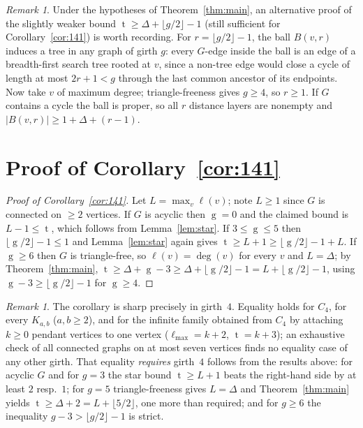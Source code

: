 \documentclass[11pt]{article}
\numberwithin{equation}{section}
\theoremstyle{remark}
\newtheorem{remark}[theorem]{Remark}
\newcommand{\tr}{\operatorname{t}}
\newcommand{\gr}{\operatorname{g}}
\newcommand{\lv}{\ell}
\begin{document}
\begin{remark}
Under the hypotheses of Theorem~\ref{thm:main}, an alternative proof of the
slightly weaker bound $\tr\ge\Delta+\lfloor g/2\rfloor-1$ (still sufficient
for Corollary~\ref{cor:141}) is worth recording.  For
$r=\lfloor g/2\rfloor-1$, the ball $B(v,r)$ induces a tree in any graph of
girth $g$: every $G$-edge inside the ball is an edge of a breadth-first
search tree rooted at $v$, since a non-tree edge would close a cycle of
length at most $2r+1<g$ through the last common ancestor of its endpoints.
Now take $v$ of maximum degree; triangle-freeness gives $g\ge4$, so
$r\ge1$.  If $G$ contains a cycle the ball is proper, so all $r$ distance
layers are nonempty and $|B(v,r)|\ge1+\Delta+(r-1)$.
\end{remark}

\section{Proof of Corollary~\texorpdfstring{\ref{cor:141}}{1.2}}

\begin{proof}[Proof of Corollary~\ref{cor:141}]
Let $L=\max_v\lv(v)$; note $L\ge1$ since $G$ is connected on $\ge2$
vertices.  If $G$ is acyclic then $\gr=0$ and the claimed bound is
$L-1\le\tr$, which follows from Lemma~\ref{lem:star}.  If
$3\le\gr\le5$ then $\lfloor \gr/2\rfloor-1\le1$ and Lemma~\ref{lem:star}
again gives $\tr\ge L+1\ge\lfloor \gr/2\rfloor-1+L$.  If $\gr\ge6$ then $G$
is triangle-free, so $\lv(v)=\deg(v)$ for every $v$ and $L=\Delta$; by
Theorem~\ref{thm:main},
$\tr\ge\Delta+\gr-3\ge\Delta+\lfloor \gr/2\rfloor-1=L+\lfloor
\gr/2\rfloor-1$, using $\gr-3\ge\lfloor \gr/2\rfloor-1$ for $\gr\ge4$.
\end{proof}

\begin{remark}
The corollary is sharp precisely in girth~$4$.  Equality holds for $C_4$, for
every $K_{a,b}$ ($a,b\ge2$), and for the infinite family obtained from $C_4$
by attaching $k\ge0$ pendant vertices to one vertex ($\lv_{\max}=k+2$,
$\tr=k+3$); an exhaustive check of all connected graphs on at most seven
vertices finds no equality case of any other girth.  That equality
\emph{requires} girth~$4$ follows from the results above: for acyclic $G$
and for $g=3$ the star bound $\tr\ge L+1$ beats the right-hand side by at
least $2$ resp.\ $1$; for $g=5$ triangle-freeness gives $L=\Delta$ and
Theorem~\ref{thm:main} yields $\tr\ge\Delta+2=L+\lfloor5/2\rfloor$, one more
than required; and for $g\ge6$ the inequality $g-3>\lfloor g/2\rfloor-1$ is
strict.
\end{remark}
\end{document}
